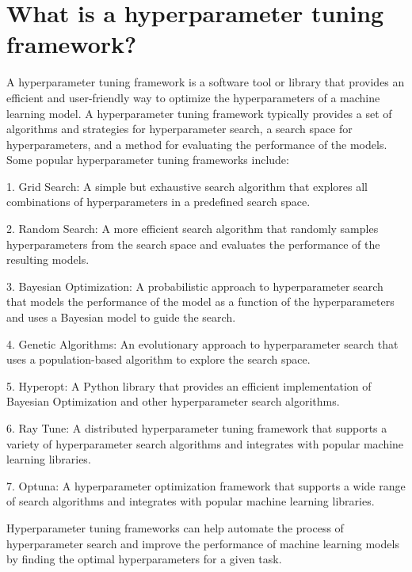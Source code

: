 \section{What is a hyperparameter tuning framework?}
A hyperparameter tuning framework is a software tool or library that provides an efficient and user-friendly way to optimize the hyperparameters of a machine learning model. A hyperparameter tuning framework typically provides a set of algorithms and strategies for hyperparameter search, a search space for hyperparameters, and a method for evaluating the performance of the models. Some popular hyperparameter tuning frameworks include:

1. Grid Search: A simple but exhaustive search algorithm that explores all combinations of hyperparameters in a predefined search space.

2. Random Search: A more efficient search algorithm that randomly samples hyperparameters from the search space and evaluates the performance of the resulting models.

3. Bayesian Optimization: A probabilistic approach to hyperparameter search that models the performance of the model as a function of the hyperparameters and uses a Bayesian model to guide the search.

4. Genetic Algorithms: An evolutionary approach to hyperparameter search that uses a population-based algorithm to explore the search space.

5. Hyperopt: A Python library that provides an efficient implementation of Bayesian Optimization and other hyperparameter search algorithms.

6. Ray Tune: A distributed hyperparameter tuning framework that supports a variety of hyperparameter search algorithms and integrates with popular machine learning libraries.

7. Optuna: A hyperparameter optimization framework that supports a wide range of search algorithms and integrates with popular machine learning libraries.

Hyperparameter tuning frameworks can help automate the process of hyperparameter search and improve the performance of machine learning models by finding the optimal hyperparameters for a given task.

